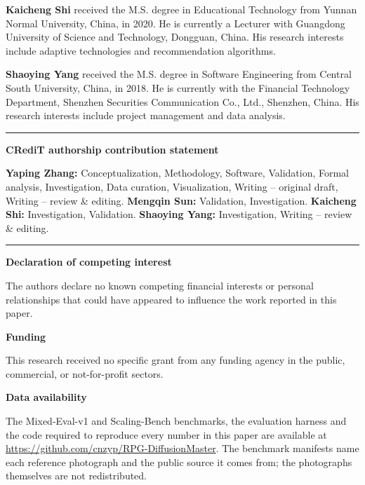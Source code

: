 \documentclass[10pt,a4paper]{article}
\begin{document}
\textbf{Kaicheng Shi} received the M.S. degree in Educational Technology from
Yunnan Normal University, China, in 2020.  He is currently a Lecturer with
Guangdong University of Science and Technology, Dongguan, China.  His research
interests include adaptive technologies and recommendation algorithms.

\textbf{Shaoying Yang} received the M.S. degree in Software Engineering from
Central South University, China, in 2018.  He is currently with the Financial
Technology Department, Shenzhen Securities Communication Co., Ltd., Shenzhen,
China.  His research interests include project management and data analysis.

\vspace{4pt}
\hrule
\vspace{4pt}

\textbf{CRediT authorship contribution statement}

\textbf{Yaping Zhang:} Conceptualization, Methodology, Software, Validation,
Formal analysis, Investigation, Data curation, Visualization, Writing --
original draft, Writing -- review \& editing.
\textbf{Mengqin Sun:} Validation, Investigation.
\textbf{Kaicheng Shi:} Investigation, Validation.
\textbf{Shaoying Yang:} Investigation, Writing -- review \& editing.

\vspace{4pt}
\hrule
\vspace{4pt}

\textbf{Declaration of competing interest}

The authors declare no known competing financial interests or personal
relationships that could have appeared to influence the work reported in this
paper.

\textbf{Funding}

This research received no specific grant from any funding agency in the
public, commercial, or not-for-profit sectors.

\textbf{Data availability}

The Mixed-Eval-v1 and Scaling-Bench benchmarks, the evaluation harness and
the code required to reproduce every number in this paper are available at
\url{https://github.com/cnzyp/RPG-DiffusionMaster}.  The benchmark manifests
name each reference photograph and the public source it comes from; the
photographs themselves are not redistributed.
\end{document}
